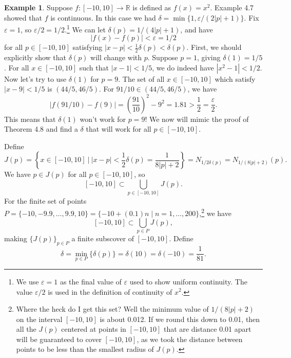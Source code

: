 \documentclass{article}
\newcommand{\R}{\mathbb{R}}
\theoremstyle{definition}
\newtheorem{example}{Example}[section]
\begin{document}
\begin{example}
	Suppose $ f:[-10,10]\to\R $ is defined as $ f(x)=x^2 $. Example 4.7 showed that $ f $ is continuous. In this case we had $ \delta=\min\{1,\varepsilon/(2|p|+1)\} $. Fix $ \varepsilon=1 $, so $ \varepsilon/2=1/2 $.\footnote{We use $ \varepsilon=1 $ as the final value of $ \varepsilon $ used to show uniform continuity. The value $ \varepsilon/2 $ is used in the definition of continuity of $ x^2 $.} We can let $ \delta(p)=1/(4|p|+1) $, and have $$|f(x)-f(p)|<\varepsilon=1/2 $$ for all $ p\in [-10,10] $ satisfying $ |x-p|<\frac{1}{2}\delta(p)<\delta(p) $. First, we should explicitly show that $ \delta(p) $ will change with $ p $. Suppose $ p=1 $, giving $ \delta(1)=1/5 $. For all $ x\in[-10,10] $ such that $ |x-1|<1/5 $, we do indeed have $ |x^2-1|<1/2 $. Now let's try to use $ \delta(1) $ for $ p=9 $. The set of all $ x\in[-10,10] $ which satisfy $ |x-9|<1/5 $ is $ (44/5,46/5) $. For $ 91/10\in(44/5,46/5) $, we have $$ |f(91/10)-f(9)|=\left(\frac{91}{10}\right)^2-9^2=1.81>\frac{1}{2}=\frac{\varepsilon}{2}.$$ This means that $ \delta(1) $ won't work for $ p=9 $! We now will mimic the proof of Theorem 4.8 and find a $ \delta $ that will work for all $ p\in[-10,10] $. 
	
	 Define $$J(p)=\left\{x\in[-10,10]\ \Big|\  |x-p|<\frac{1}{2}\delta(p)=\frac{1}{8|p|+2}\right\}=N_{1/2\delta(p)}=N_{1/(8|p|+2)}(p). $$ We have $ p\in J(p) $ for all $ p\in[-10,10] $, so $$ [-10,10]\subset\bigcup_{p\in [-10,10]}J(p) .$$ For the finite set of points $ P=\{-10,-9.9,\ldots,9.9,10\}=\{-10+(0.1)n\mid n=1,\ldots, 200\} $,\footnote{Where the heck do I get this set? Well the minimum value of $ 1/(8|p|+2) $ on the interval $ [-10,10] $ is about 0.012. If we round this down to 0.01, then all the $ J(p) $ centered at points in $ [-10,10] $ that are distance 0.01 apart will be guaranteed to cover $ [-10,10] $, as we took the distance between points to be less than the smallest radius of $ J(p) $. } we have $$ [-10,10]\subset\bigcup_{p\in P}J(p) ,$$ making $ \{J(p)\}_{p\in P} $ a finite subscover of $ [-10,10] $. Define $$ \delta=\min\limits_{p\in P}\{\delta(p)\}=\delta(10)=\delta(-10)=\frac{1}{81} .$$
	 

\end{example}
\end{document}
